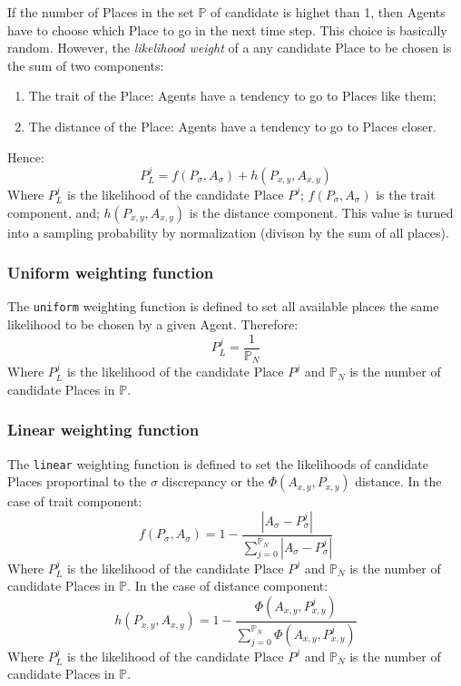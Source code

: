 \documentclass{article}
\begin{document}
If the number of Places in the set $\mathbb{P}$ of candidate is highet than 1, then Agents have to choose which Place to go in the next time step. This choice is basically random. However, the \textit{likelihood weight} of a any candidate Place to be chosen is the sum of two components:
\begin{enumerate}

\item The trait of the Place: Agents have a tendency to go to Places like them;
\item The distance of the Place: Agents have a tendency to go to Places closer.
\end{enumerate}
Hence:
\begin{equation}
    P^{j}_L = f(P_{\sigma}, A_{\sigma}) + h(P_{x,y}, A_{x,y})
\end{equation}
Where $P^{j}_L$ is the likelihood of the candidate Place $P^{j}$; $f(P_{\sigma}, A_{\sigma})$ is the trait component, and; $h(P_{x,y}, A_{x,y})$ is the distance component. This value is turned into a sampling probability by normalization (divison by the sum of all places).

\subsubsection{Uniform weighting function}

\par The \texttt{uniform} weighting function is defined to set all available places the same likelihood to be chosen by a given Agent. Therefore:
\begin{equation}
    P^{j}_L = \frac{1}{{\mathbb{P}_N}}
\end{equation}
Where $P^{j}_L$ is the likelihood of the candidate Place $P^{j}$ and ${\mathbb{P}_N}$ is the number of candidate Places in $\mathbb{P}$.

\subsubsection{Linear weighting function}

\par The \texttt{linear} weighting function is defined to set the likelihoods of candidate Places proportinal to the $\sigma$ discrepancy or the $\Phi(A_{x,y},P_{x,y})$ distance. In the case of trait component:
\begin{equation}
     f(P_{\sigma}, A_{\sigma}) = 1 - \frac{|A_{\sigma} - P^{j}_{\sigma}|}{\sum_{j=0}^{\mathbb{P}_N} |A_{\sigma} - P^{j}_{\sigma}|}
\end{equation}
Where $P^{j}_L$ is the likelihood of the candidate Place $P^{j}$ and ${\mathbb{P}_N}$ is the number of candidate Places in $\mathbb{P}$. In the case of distance component:
\begin{equation}
      h(P_{x,y}, A_{x,y}) = 1 - \frac{\Phi(A_{x,y},P^{j}_{x,y})}{\sum_{j=0}^{\mathbb{P}_N} \Phi(A_{x,y},P^{j}_{x,y})}
\end{equation}
Where $P^{j}_L$ is the likelihood of the candidate Place $P^{j}$ and ${\mathbb{P}_N}$ is the number of candidate Places in $\mathbb{P}$.
\end{document}
